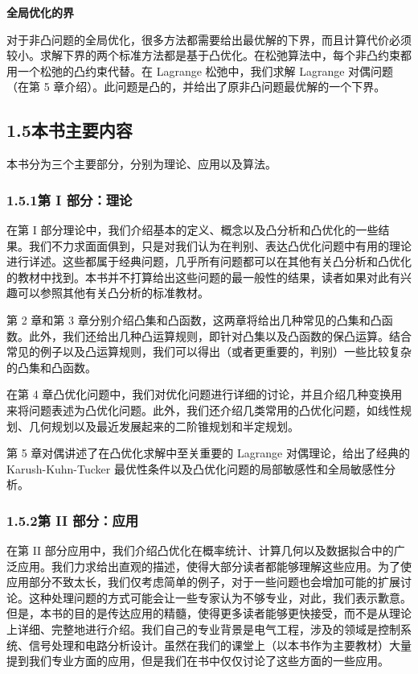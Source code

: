 \documentclass[UTF8,12pt,a4paper,fontset=fandol]{ctexart}
\begin{document}
\noindent\textbf{全局优化的界}

对于非凸问题的全局优化，很多方法都需要给出最优解的下界，而且计算代价必须较小。求解下界的两个标准方法都是基于凸优化。在松弛算法中，每个非凸约束都用一个松弛的凸约束代替。在 Lagrange 松弛中，我们求解 Lagrange 对偶问题（在第 5 章介绍）。此问题是凸的，并给出了原非凸问题最优解的一个下界。

\subsection*{1.5\quad 本书主要内容}

本书分为三个主要部分，分别为理论、应用以及算法。

\subsubsection*{1.5.1\quad 第 I 部分：理论}

在第 I 部分理论中，我们介绍基本的定义、概念以及凸分析和凸优化的一些结果。我们不力求面面俱到，只是对我们认为在判别、表达凸优化问题中有用的理论进行详述。这些都属于经典问题，几乎所有问题都可以在其他有关凸分析和凸优化的教材中找到。本书并不打算给出这些问题的最一般性的结果，读者如果对此有兴趣可以参照其他有关凸分析的标准教材。

第 2 章和第 3 章分别介绍凸集和凸函数，这两章将给出几种常见的凸集和凸函数。此外，我们还给出几种凸运算规则，即针对凸集以及凸函数的保凸运算。结合常见的例子以及凸运算规则，我们可以得出（或者更重要的，判别）一些比较复杂的凸集和凸函数。

在第 4 章凸优化问题中，我们对优化问题进行详细的讨论，并且介绍几种变换用来将问题表述为凸优化问题。此外，我们还介绍几类常用的凸优化问题，如线性规划、几何规划以及最近发展起来的二阶锥规划和半定规划。

第 5 章对偶讲述了在凸优化求解中至关重要的 Lagrange 对偶理论，给出了经典的 Karush-Kuhn-Tucker 最优性条件以及凸优化问题的局部敏感性和全局敏感性分析。

\subsubsection*{1.5.2\quad 第 II 部分：应用}

在第 II 部分应用中，我们介绍凸优化在概率统计、计算几何以及数据拟合中的广泛应用。我们力求给出直观的描述，使得大部分读者都能够理解这些应用。为了使应用部分不致太长，我们仅考虑简单的例子，对于一些问题也会增加可能的扩展讨论。这种处理问题的方式可能会让一些专家认为不够专业，对此，我们表示歉意。但是，本书的目的是传达应用的精髓，使得更多读者能够更快接受，而不是从理论上详细、完整地进行介绍。我们自己的专业背景是电气工程，涉及的领域是控制系统、信号处理和电路分析设计。虽然在我们的课堂上（以本书作为主要教材）大量提到我们专业方面的应用，但是我们在书中仅仅讨论了这些方面的一些应用。
\end{document}
